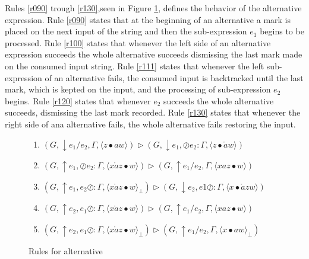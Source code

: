 \documentclass[manuscript, review, sigconf]{acmart}
\newcommand{\zpp}[2]{\langle #1\bullet #2 \rangle}
\newcommand{\zppf}[2]{\langle #1\bullet #2 \rangle_{\bot}}
\begin{document}
Rules \ref{r090} trough \ref{r130},seen in Figure \ref{fig:rule-alt}, defines the behavior of the alternative expression. Rule \ref{r090} states that at the beginning of an alternative a mark is placed  on the next input of the string and then the sub-expression $e_1$ begins to be processed.  Rule \ref{r100} states that whenever the left side of an alternative expression succeeds the whole alternative succeeds dismissing the last mark made on the consumed input string. Rule \ref{r111} states that whenever the left sub-expression of an alternative fails, the consumed input is backtracked until the last mark, which is kepted on the input, and the processing of sub-expression $e_2$ begins. Rule \ref{r120} states that whenever $e_2$ succeeds the whole alternative succeeds, dismissing the last mark recorded. Rule \ref{r130} states that whenever the right side of ana alternative fails, the whole alternative fails restoring the input. 


\begin{figure}[H]
\begin{enumerate}\addtocounter{enumi}{9}
   \setlength\itemsep{0.5em}
  \item \label{r090} $(G, \downarrow e_1 / e_2,\Gamma ,\zpp{z}{aw})         \rhd  (G, \downarrow e_1,  \oslash e_2 : \Gamma, \zpp{z}{\mathring{a}w})$ 
  \item \label{r100} $(G, \uparrow e_1 ,\oslash e_2 : \Gamma ,\zpp{x\mathring{a}z}{w})   \rhd  (G, \uparrow e_1 / e_2 , \Gamma, \zpp{xaz}{w})$ 
 
  \item \label{r111} $(G, \uparrow e_1 ,e_2 \oslash  : \Gamma ,\zppf{x\mathring{a}z}{w}) \rhd  (G, \downarrow e_2 , e1 \oslash : \Gamma, \zpp{x}{\mathring{a}zw})$
 
  \item \label{r120} $(G, \uparrow e_2 ,e_1 \oslash  : \Gamma ,\zpp{x\mathring{a}z}{w})  \rhd  (G, \uparrow e_1 / e_2, \Gamma, \zpp{xaz}{w})$ 
  \item \label{r130} $(G, \uparrow e_2 ,e_1 \oslash  : \Gamma ,\zppf{x\mathring{a}z}{w}) \rhd  (G, \uparrow e_1 / e_2, \Gamma, \zppf{x}{aw})$
\end{enumerate}
 \caption{Rules for alternative}
 \label{fig:rule-alt}
\end{figure}
\end{document}
